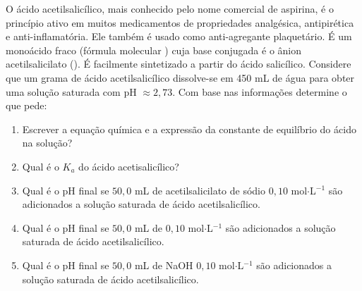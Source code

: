 O ácido acetilsalicílico, mais conhecido pelo nome comercial de aspirina, é o princípio ativo em muitos medicamentos de propriedades analgésica, antipirética e anti-inflamatória.
Ele também é usado como anti-agregante plaquetário.
É um monoácido fraco (fórmula molecular ) cuja base conjugada é o ânion acetilsalicilato ().
É facilmente sintetizado a partir do ácido salicílico.
Considere que um grama de ácido acetilsalicílico dissolve-se em 450 mL de água para obter uma solução saturada com pH $\approx 2,73$.
Com base nas informações determine o que pede:

\begin{enumerate}[label = (\alph*)]
	\item Escrever a equação química e a expressão da constante de equilíbrio do ácido na solução? 
	\item Qual é o $K_a$ do ácido acetisalicílico?
	\item Qual é o pH final se $50,0$ mL de acetilsalicilato de sódio $0,10$ mol$\cdot$L$^{-1}$ são adicionados a solução saturada de ácido acetilsalicílico.
	\item Qual é o pH final se $50,0$ mL de  $0,10$ mol$\cdot$L$^{-1}$ são adicionados a solução saturada de ácido acetilsalicílico.
	\item Qual é o pH final se $50,0$ mL de NaOH $0,10$ mol$\cdot$L$^{-1}$ são adicionados a solução saturada de ácido acetilsalicílico.
\end{enumerate}
